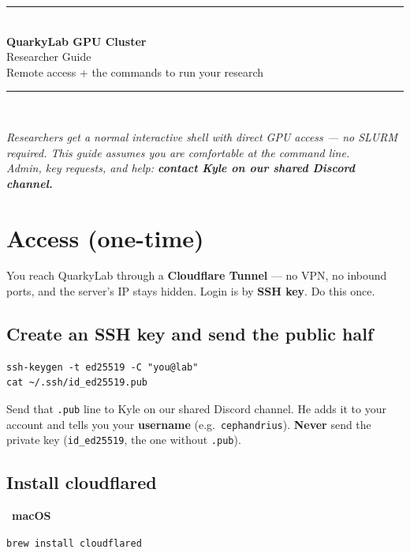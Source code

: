 \documentclass[11pt]{article}
\newcommand{\LabName}{QuarkyLab}
\newcommand{\Contact}{our shared Discord channel}
\newcommand{\code}[1]{\texttt{#1}}
\newcommand{\osbadge}[1]{\vspace{0.4ex}\noindent{\color{quarkA}\rule{2pt}{10pt}}\ \textbf{\color{quarkA}#1}\par\nopagebreak\vspace{0.3ex}}
\begin{document}
\begin{center}
{\color{quarkA}\rule{\linewidth}{2pt}}\\[0.4cm]
{\huge\bfseries\color{quarkA} \LabName{} GPU Cluster}\\[0.25cm]
{\Large\color{quarkB} Researcher Guide}\\[0.3cm]
{\normalsize Remote access + the commands to run your research}\\[0.35cm]
{\color{quarkA}\rule{\linewidth}{2pt}}\\[0.5cm]
\end{center}

\begin{tcolorbox}[colback=quarkB!6,colframe=quarkB,arc=3pt,boxrule=0.8pt]
\centering\itshape Researchers get a normal interactive shell with direct GPU access --- no SLURM required. This guide assumes you are comfortable at the command line.\\[2pt]
Admin, key requests, and help: \textbf{contact Kyle on \Contact.}
\end{tcolorbox}

\vspace{0.4cm}

\section{Access (one-time)}
You reach \LabName{} through a \textbf{Cloudflare Tunnel} --- no VPN, no inbound ports, and the server's IP stays hidden. Login is by \textbf{SSH key}. Do this once.

\subsection{Create an SSH key and send the public half}
\begin{lstlisting}
ssh-keygen -t ed25519 -C "you@lab"
cat ~/.ssh/id_ed25519.pub
\end{lstlisting}
Send that \code{.pub} line to Kyle on \Contact. He adds it to your account and tells you your \textbf{username} (e.g.\ \code{cephandrius}). \textbf{Never} send the private key (\code{id\_ed25519}, the one without \code{.pub}).

\subsection{Install cloudflared}
\osbadge{macOS}
\code{brew install cloudflared}
\end{document}
